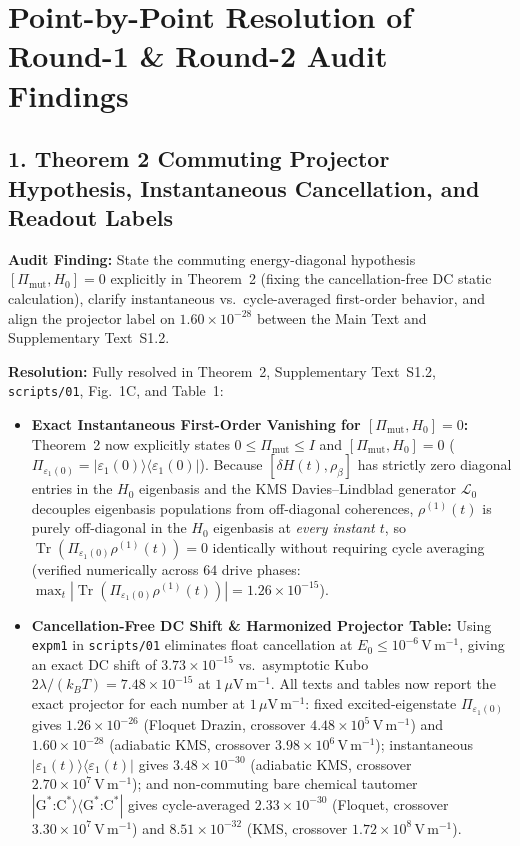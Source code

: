 \documentclass[10pt,letterpaper]{article}
\newcommand{\Lcal}{\mathcal{L}}
\newcommand{\Tr}{\operatorname{Tr}}
\begin{document}
\section*{Point-by-Point Resolution of Round-1 \& Round-2 Audit Findings}

\subsection*{1. Theorem 2 Commuting Projector Hypothesis, Instantaneous Cancellation, and Readout Labels}
\textbf{Audit Finding:} State the commuting energy-diagonal hypothesis $[\Pi_{\mathrm{mut}}, H_0] = 0$ explicitly in Theorem~2 (fixing the cancellation-free DC static calculation), clarify instantaneous vs.\ cycle-averaged first-order behavior, and align the projector label on $1.60 \times 10^{-28}$ between the Main Text and Supplementary Text~S1.2.

\medskip\noindent\textbf{Resolution:} Fully resolved in Theorem~2, Supplementary Text~S1.2, \texttt{scripts/01}, Fig.~1C, and Table~1:
\begin{itemize}[leftmargin=1.6em,itemsep=2pt]
    \item \textbf{Exact Instantaneous First-Order Vanishing for $[\Pi_{\mathrm{mut}}, H_0] = 0$:} Theorem~2 now explicitly states $0 \le \Pi_{\mathrm{mut}} \le I$ and $[\Pi_{\mathrm{mut}}, H_0] = 0$ ($\Pi_{\varepsilon_1(0)} = |\varepsilon_1(0)\rangle\langle\varepsilon_1(0)|$). Because $[\delta H(t), \rho_\beta]$ has strictly zero diagonal entries in the $H_0$ eigenbasis and the KMS Davies--Lindblad generator $\Lcal_0$ decouples eigenbasis populations from off-diagonal coherences, $\rho^{(1)}(t)$ is purely off-diagonal in the $H_0$ eigenbasis at \emph{every instant $t$}, so $\Tr(\Pi_{\varepsilon_1(0)}\rho^{(1)}(t)) = 0$ identically without requiring cycle averaging (verified numerically across $64$ drive phases: $\max_t |\Tr(\Pi_{\varepsilon_1(0)}\rho^{(1)}(t))| = 1.26 \times 10^{-15}$).
    \item \textbf{Cancellation-Free DC Shift \& Harmonized Projector Table:} Using \texttt{expm1} in \texttt{scripts/01} eliminates float cancellation at $E_0 \le 10^{-6}\,\mathrm{V\,m^{-1}}$, giving an exact DC shift of $3.73 \times 10^{-15}$ vs.\ asymptotic Kubo $2\lambda/(k_B T) = 7.48 \times 10^{-15}$ at $1\,\mu\mathrm{V\,m^{-1}}$. All texts and tables now report the exact projector for each number at $1\,\mu\mathrm{V\,m^{-1}}$: fixed excited-eigenstate $\Pi_{\varepsilon_1(0)}$ gives $1.26 \times 10^{-26}$ (Floquet Drazin, crossover $4.48 \times 10^5\,\mathrm{V\,m^{-1}}$) and $1.60 \times 10^{-28}$ (adiabatic KMS, crossover $3.98 \times 10^6\,\mathrm{V\,m^{-1}}$); instantaneous $|\varepsilon_1(t)\rangle\langle\varepsilon_1(t)|$ gives $3.48 \times 10^{-30}$ (adiabatic KMS, crossover $2.70 \times 10^7\,\mathrm{V\,m^{-1}}$); and non-commuting bare chemical tautomer $|\mathrm{G}^*\text{:}\mathrm{C}^*\rangle\langle\mathrm{G}^*\text{:}\mathrm{C}^*|$ gives cycle-averaged $2.33 \times 10^{-30}$ (Floquet, crossover $3.30 \times 10^7\,\mathrm{V\,m^{-1}}$) and $8.51 \times 10^{-32}$ (KMS, crossover $1.72 \times 10^8\,\mathrm{V\,m^{-1}}$).
\end{itemize}
\end{document}
